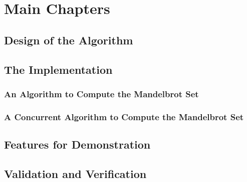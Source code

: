 \chapter{Main Chapters}
\section{Design of the Algorithm}

\section{The Implementation}

\subsection{An Algorithm to Compute the Mandelbrot Set}

\subsection{A Concurrent Algorithm to Compute the Mandelbrot Set}

\section{Features for Demonstration}

\section{Validation and Verification}

